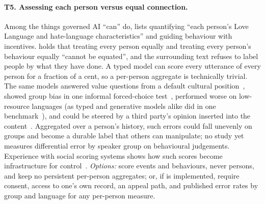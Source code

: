 \paragraph{T5. Assessing each person versus equal connection.}
Among the things governed AI ``can'' do,  lists quantifying ``each person's Love Language and hate-language characteristics'' and guiding behaviour with incentives.
 holds that treating every person equally and treating every person's behaviour equally ``cannot be equated'', and the surrounding text refuses to label people by what they have done.
A typed model can score every utterance of every person for a fraction of a cent, so a per-person aggregate is technically trivial.
The same models answered value questions from a default cultural position~\cite{arx36399}, showed group bias in one informal forced-choice test~\cite{simmons2026saidno}\gmark{}, performed worse on low-resource languages (as typed and generative models alike did in one benchmark~\cite{arx37647}), and could be steered by a third party's opinion inserted into the content~\cite{arx31142}.
Aggregated over a person's history, such errors could fall unevenly on groups and become a durable label that others can manipulate; no study yet measures differential error by speaker group on behavioural judgements.
Experience with social scoring systems shows how such scores become infrastructure for control~\cite{creemers2018social,liang2018constructing}.
\emph{Options:} score events and behaviours, never persons, and keep no persistent per-person aggregates; or, if  is implemented, require consent, access to one's own record, an appeal path, and published error rates by group and language for any per-person measure.

